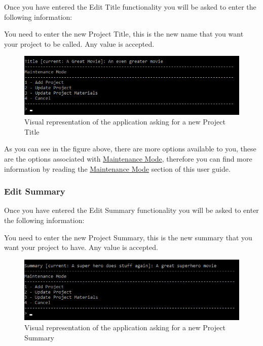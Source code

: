 \documentclass[
  english,
  a4paper,
,tablecaptionabove
]{scrartcl}
\begin{document}
Once you have entered the Edit Title functionality you will be asked to
enter the following information:

You need to enter the new Project Title, this is the new name that you
want your project to be called. Any value is accepted.

\begin{figure}
\centering
\includegraphics{images/user-guide/maintenance-mode/update-project-title.png}
\caption{Visual representation of the application asking for a new
Project Title}
\end{figure}

As you can see in the figure above, there are more options available to
you, these are the options associated with
\protect\hyperlink{using-maintenance-mode}{Maintenance Mode}, therefore
you can find more information by reading the
\protect\hyperlink{using-maintenance-mode}{Maintenance Mode} section of
this user guide.

\newpage

\hypertarget{edit-summary-1}{%
\subsubsection{Edit Summary}\label{edit-summary-1}}

Once you have entered the Edit Summary functionality you will be asked
to enter the following information:

You need to enter the new Project Summary, this is the new summary that
you want your project to have. Any value is accepted.

\begin{figure}
\centering
\includegraphics{images/user-guide/maintenance-mode/update-project-summary.png}
\caption{Visual representation of the application asking for a new
Project Summary}
\end{figure}
\end{document}
